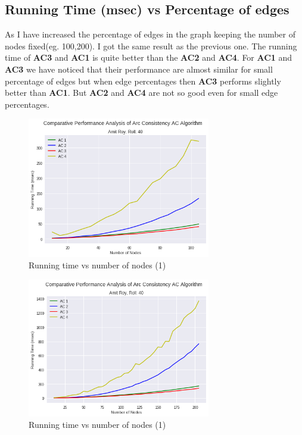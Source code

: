\documentclass[11pt , conference]{IEEEtran}
\begin{document}
	\subsection{Running Time (msec) vs Percentage of edges}
	As I have increased the percentage of edges in the graph keeping the number of nodes fixed(eg. 100,200). I got the same result as the previous one. The running time of \textbf{AC3} and \textbf{AC1} is quite better than the \textbf{AC2} and \textbf{AC4}. For \textbf{AC1} and \textbf{AC3} we have noticed that their performance are almost similar for small percentage of edges but when edge percentages then \textbf{AC3} performs slightly better than \textbf{AC1}. But \textbf{AC2} and \textbf{AC4} are not so good even for small edge percentages.
	\newpage
	\begin{figure}[h]
		\centering
		\includegraphics[width=8cm]{running_time_node_100.png}
		\captionsetup{singlelinecheck = false, format= hang,  font=footnotesize, labelsep=space}
		\caption{Running time vs number of nodes (1)}
		\label{figure 1}
	\end{figure}
	\begin{figure}[h]
		\centering
		\includegraphics[width=8cm]{running_time_node_200.png}
		\captionsetup{singlelinecheck = false, format= hang,  font=footnotesize, labelsep=space}
		\caption{Running time vs number of nodes (1)}
		\label{figure 2}
	\end{figure}
	
\end{document}
